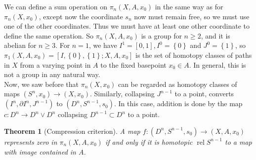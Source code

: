 \documentclass[reqno]{amsart}
\newtheorem{theorem}{Theorem}[section]
\theoremstyle{definition}
\theoremstyle{remark}
\DeclareMathOperator{\rel}{rel}
\begin{document}
  We can define a sum operation on $\pi_n \left( X, A, x_0 \right) $ 
  in the same way as for $\pi_n \left( X, x_0 \right) $, except
  now the coordinate $s_n$ now must remain free, so
  we must use one of the other coordinates. Thus
  we must have at least one other coordinate to define
  the same operation. So $\pi_n \left( X, A, x_0 \right) $ is
  a group for $n\ge 2$, and it is abelian for
  $n\ge 3$. For $n=1$, we have
  $I^{1} = \left[ 0,1 \right] , I^{0} = \left\{ 0 \right\} $ 
  and $J^{0} = \left\{ 1 \right\} $, so
  $\pi_1 \left( X, A, x_0 \right) 
  = \left[ I, \left\{ 0 \right\} , \left\{ 1 \right\} ;
  X, A, x_0 \right] $ is the set of homotopy classes of paths in
  $X$ from a varying point in $A$ to the fixed basepoint
  $x_0 \in A$. In general, this is not a group in any
  natural way. \\
  \linebreak
  Now, we saw before that
  $\pi_n \left( X, x_0 \right) $ can be regarded as
  homotopy classes of maps $\left( S^{n}, x_0 \right) \to 
  \left( X, x_0 \right) $. Similarly, collapsing
  $J^{n-1}$ to a point, converts
  $\left( I^{n} , \partial I^{n}, J^{n-1} \right) $ 
  to $\left( D^{n}, S^{n-1}, s_0 \right) $.
  In this case, addition is done by
  the map $c \colon D^{n} \to D^{n} \vee D^{n}$ collapsing
  $D^{n-1} \subset D^{n}$ to a point.\\
  \linebreak
  \begin{theorem}[Compression criterion]\label{Thm:Compression}
      A map $f \colon \left( D^{n}, S^{n-1}, s_0 \right) 
      \to \left( X, A, x_0 \right) $ represents zero
      in $\pi_n \left( X, A, x_0 \right) $ if and only if
      it is homotopic $\rel S^{n-1}$ to a map with image
      contained in $A$.
  \end{theorem}
  
\end{document}
